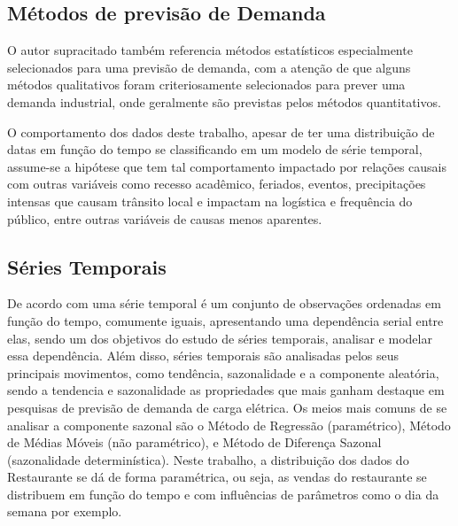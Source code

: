 \documentclass[	12pt, Times, openright, twoside, a4paper, english, brazil]{abntex2}
\begin{document}
        \subsection{Métodos de previsão de Demanda}
          O autor supracitado também referencia métodos estatísticos especialmente selecionados para uma previsão de demanda, com a atenção de que alguns métodos qualitativos foram criteriosamente selecionados para prever uma demanda industrial, onde geralmente são previstas pelos métodos quantitativos.

          O comportamento dos dados deste trabalho, apesar de ter uma distribuição de datas em função do tempo se classificando em um modelo de série temporal, assume-se a hipótese que tem tal comportamento impactado por relações causais com outras variáveis como recesso acadêmico, feriados, eventos, precipitações intensas que causam trânsito local e impactam na logística e frequência do público, entre outras variáveis de causas menos aparentes.

          \begin{figure}[H]
          \end{figure}

        \subsection{Séries Temporais}
          De acordo com  \cite{Morettin1987} uma série temporal é um conjunto de observações ordenadas em função do tempo, comumente iguais, apresentando uma dependência serial entre elas, sendo um dos objetivos do estudo de séries temporais, analisar e modelar essa dependência. Além disso, séries temporais são analisadas pelos seus principais movimentos, como tendência, sazonalidade e a componente aleatória, sendo a tendencia e sazonalidade as propriedades que mais ganham destaque em pesquisas de previsão de demanda de carga elétrica. Os meios mais comuns de se analisar a componente sazonal são o Método de Regressão (paramétrico), Método de Médias Móveis (não paramétrico), e Método de Diferença Sazonal (sazonalidade determinística).  Neste trabalho, a distribuição dos dados do Restaurante se dá de forma paramétrica, ou seja, as vendas do restaurante se distribuem em função do tempo e com influências de parâmetros como o dia da semana por exemplo. 
\end{document}
